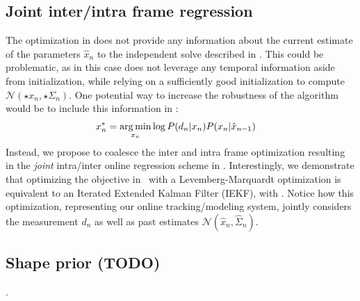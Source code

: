 \subsection{Joint inter/intra frame regression}
The optimization in  does not provide any information about the current estimate of the parameters $\hat{x}_n$ to the independent solve described in . This could be problematic, as in this case  does not leverage any temporal information aside from initialization, while relying on a sufficiently good initialization to compute $\mathcal{N}(\star{x}_n, \star{\Sigma}_n)$. One potential way to increase the robustness of the algorithm would be to include this information in :
% 
\begin{align}
x_n^* &= \operatorname*{arg\,min}_{x_n} \log  P(d_n|x_n) P(x_n |\hat{x}_{n - 1}) 
\label{eq:independenttemp}
\end{align}
% 
Instead, we propose to coalesce the inter and intra frame optimization resulting in the \emph{joint} intra/inter online regression scheme in . Interestingly, we demonstrate that optimizing the objective in~ with a Levemberg-Marquardt optimization is equivalent to an Iterated Extended Kalman Filter (IEKF), with .
% 
Notice how this optimization, representing our online tracking/modeling system, jointly considers the measurement $d_n$ as well as past estimates $\mathcal{N}(\hat{x}_n, \hat{\Sigma}_n)$.
\newpage

\subsection{Shape prior (TODO)}
\label{sec:shapeprior}
. 
